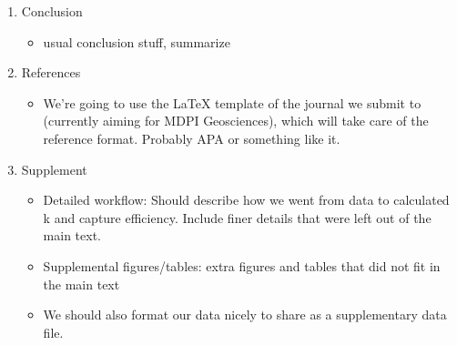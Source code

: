 \begin{enumerate}
    \item Conclusion
    \begin{itemize}
        \item usual conclusion stuff, summarize
    \end{itemize}
    
    \item References
    \begin{itemize}
        \item We're going to use the LaTeX template of the journal we submit to (currently aiming for MDPI Geosciences), which will take care of the reference format. Probably APA or something like it.
    \end{itemize}
    
    \item Supplement
    \begin{itemize}
        \item Detailed workflow: Should describe how we went from data to calculated k and capture efficiency. Include finer details that were left out of the main text.
        \item Supplemental figures/tables: extra figures and tables that did not fit in the main text
        \item We should also format our data nicely to share as a supplementary data file.
    \end{itemize}
    
\end{enumerate}
